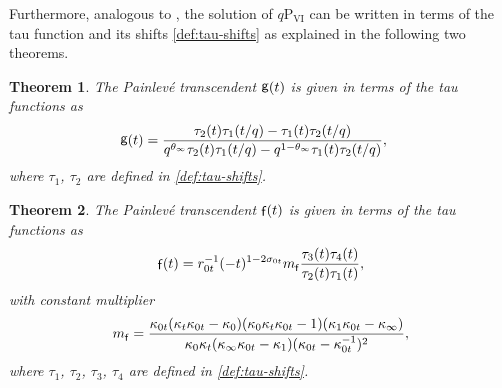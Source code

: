 \documentclass[a4paper,reqno,11pt]{amsart}
\numberwithin{equation}{section}
\numberwithin{figure}{section}
\theoremstyle{plain}
\newtheorem{theorem}{Theorem}[section]
\theoremstyle{remark}
\DeclareMathOperator{\sff}{{\sf f}}
\DeclareMathOperator{\sfg}{{\sf g}}
\newcommand\Psix{\textrm{P}_{\textrm{VI}}}
\numberwithin{rhp}{section}
\begin{document}
Furthermore, analogous to \cite[Theorem 3.3]{JNS2017},  the solution of $q\Psix$ can be written in terms of the tau function and its shifts \eqref{def:tau-shifts} as explained in the following two theorems.
\begin{theorem}\label{thm:g-tau}
The Painlev\'e transcendent $\sfg(t)$ is given in terms of the tau functions as 
\begin{align}\label{eqthm:g-tau}
    \sfg(t) &= \frac{\tau_2(t) \tau_1(t/q) - \tau_1(t) \tau_2(t/q)}{q^{\theta_{\infty}} \tau_2(t) \tau_1(t/q) -  q^{1-\theta_{\infty}} \tau_1(t) \tau_2(t/q)},
\end{align}
where $\tau_1$, $\tau_2$ are defined in \eqref{def:tau-shifts}.
\end{theorem}
\begin{theorem}\label{thm:f-tau}
The Painlev\'e transcendent $\sff(t)$ is given in terms of the tau functions as 
\begin{equation}\label{eqthm:f-tau}
    \sff(t) =   r_{0t}^{-1}(-t)^{1-2 \sigma_{0t}}m_{\sff}\frac{\tau_3(t) \tau_4 (t)}{\tau_2(t) \tau_1(t)},
    \end{equation}
    with constant multiplier
    \begin{equation*}
        m_{\sff}=\frac{\kappa_{0t} (\kappa_t\kappa_{0t} -\kappa_{0}) (\kappa_{0}\kappa_t \kappa_{0t} -1) (\kappa_{1}\kappa_{0t} -\kappa_{\infty})}{\kappa_{0}\kappa_t  (\kappa_{\infty}\kappa_{0t} -\kappa_{1}) (\kappa_{0t}-\kappa_{0t}^{-1})^2 },
   \end{equation*}
where $\tau_1$, $\tau_2$, $\tau_3$, $\tau_4$ are defined in \eqref{def:tau-shifts}.
\end{theorem}
\end{document}
